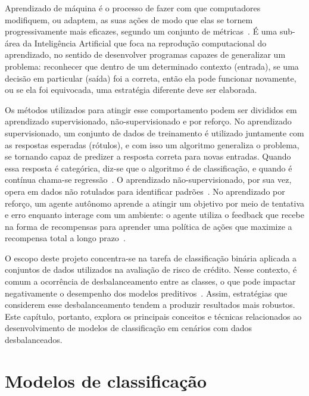 Aprendizado de máquina é o processo de fazer com que computadores modifiquem, ou adaptem, as suas ações de modo que elas se tornem progressivamente mais eficazes, segundo um conjunto de métricas~\cite{StephenMarsland2014}. É uma sub-área da Inteligência Artificial que foca na reprodução computacional do aprendizado, no sentido de desenvolver programas capazes de generalizar um problema: reconhecer que dentro de um determinado contexto (entrada), se uma decisão em particular (saída) foi a correta, então ela pode funcionar novamente, ou se ela foi equivocada, uma estratégia diferente deve ser elaborada.

Os métodos utilizados para atingir esse comportamento podem ser divididos em aprendizado supervisionado, não-supervisionado e por reforço. No aprendizado supervisionado, um conjunto de dados de treinamento é utilizado juntamente com as respostas esperadas (rótulos), e com isso um algoritmo generaliza o problema, se tornando capaz de predizer a resposta correta para novas entradas. Quando essa resposta é categórica, diz-se que o algoritmo é de classificação, e quando é contínua chama-se regressão~\cite{SindhuMeena2020}. O aprendizado não-supervisionado, por sua vez, opera em dados não rotulados para identificar padrões~\cite{Dike2018}. No aprendizado por reforço, um agente autônomo aprende a atingir um objetivo por meio de tentativa e erro enquanto interage com um ambiente: o agente utiliza o feedback que recebe na forma de recompensas para aprender uma política de ações que maximize a recompensa total a longo prazo~\cite{Sutton2018}.

O escopo deste projeto concentra-se na tarefa de classificação binária aplicada a conjuntos de dados utilizados na avaliação de risco de crédito. Nesse contexto, é comum a ocorrência de desbalanceamento entre as classes, o que pode impactar negativamente o desempenho dos modelos preditivos~\cite{Namvar2018}. Assim, estratégias que considerem esse desbalanceamento tendem a produzir resultados mais robustos. Este capítulo, portanto, explora os principais conceitos e técnicas relacionados ao desenvolvimento de modelos de classificação em cenários com dados desbalanceados.

\section{Modelos de classificação}

